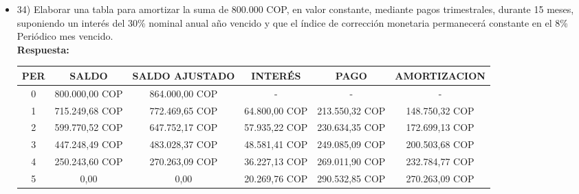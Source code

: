 \begin{itemize}
 \item 34) Elaborar una tabla para amortizar la suma de 800.000 COP, en valor constante, mediante pagos trimestrales, durante 15 meses, suponiendo un interés del 30\% nominal anual año vencido y que el índice de corrección monetaria permanecerá constante en el 8\% Periódico mes vencido.\\
       \textbf{ Respuesta:}\\
       \begin{center}
       \resizebox{\textwidth}{!}
       {\begin{tabular}{| c | c | c | c | c | c |}\hline
            \textbf{PER} & \textbf{SALDO} & \textbf{SALDO AJUSTADO} & \textbf{INTERÉS} & \textbf{PAGO} & \textbf{AMORTIZACION}  \\ \hline
        0 & 800.000,00 COP & 864.000,00 COP & - & - & - \\ \hline
        1 & 715.249,68 COP & 772.469,65 COP & 64.800,00 COP & 213.550,32 COP & 148.750,32 COP \\ \hline
        2 & 599.770,52 COP & 647.752,17 COP & 57.935,22 COP & 230.634,35 COP & 172.699,13 COP \\ \hline
        3 & 447.248,49 COP & 483.028,37 COP & 48.581,41 COP & 249.085,09 COP & 200.503,68 COP \\ \hline
        4 & 250.243,60 COP & 270.263,09 COP & 36.227,13 COP & 269.011,90 COP & 232.784,77 COP \\ \hline
        5 & 0,00 & 0,00 & 20.269,76 COP & 290.532,85 COP & 270.263,09 COP \\ \hline
        \end{tabular}}
        
        \end{center}


\end{itemize}

